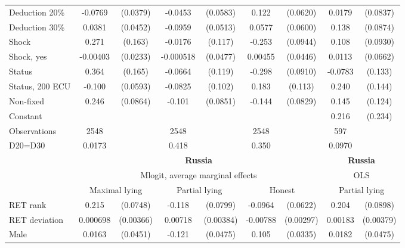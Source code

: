 \begin{tabular}{l|cccccc|cc}
Deduction 20\%&  -0.0769\sym{**} & (0.0379)&  -0.0453         & (0.0583)&    0.122\sym{**} & (0.0620)&   0.0179         & (0.0837)\\
Deduction 30\%&   0.0381         & (0.0452)&  -0.0959\sym{*}  & (0.0513)&   0.0577         & (0.0600)&    0.138         & (0.0874)\\
Shock         &    0.271\sym{*}  &  (0.163)&  -0.0176         &  (0.117)&   -0.253\sym{***}& (0.0944)&    0.108         & (0.0930)\\
Shock, yes    & -0.00403         & (0.0233)&-0.000518         & (0.0477)&  0.00455         & (0.0446)&   0.0113         & (0.0662)\\
Status        &    0.364\sym{**} &  (0.165)&  -0.0664         &  (0.119)&   -0.298\sym{***}& (0.0910)&  -0.0783         &  (0.133)\\
Status, 200 ECU&   -0.100\sym{*}  & (0.0593)&  -0.0825         &  (0.102)&    0.183         &  (0.113)&    0.240         &  (0.144)\\
Non-fixed     &    0.246\sym{***}& (0.0864)&   -0.101         & (0.0851)&   -0.144\sym{*}  & (0.0829)&    0.145         &  (0.124)\\
Constant        &                  &         &                  &         &                  &         &    0.216         &  (0.234)\\
\hline
Observations    &     2548         &         &     2548         &         &     2548         &         &      597         &         \\
D20=D30         &   0.0173         &         &    0.418         &         &    0.350         &         &   0.0970         &         \\
\hline\hline
&\multicolumn{6}{c|}{\bf Russia}&\multicolumn{2}{c}{\bf Russia}\\ &\multicolumn{6}{c|}{Mlogit, average marginal effects }&\multicolumn{2}{c}{OLS}\\
                &\multicolumn{2}{c}{Maximal lying}&\multicolumn{2}{c}{Partial lying}&\multicolumn{2}{c|}{Honest}  &\multicolumn{2}{c}{Partial lying}\\
\hline
RET rank        &    0.215\sym{***}& (0.0748)&   -0.118         & (0.0799)&  -0.0964         & (0.0622)&    0.204\sym{**} & (0.0898)\\
RET deviation   & 0.000698         &(0.00366)&  0.00718\sym{*}  &(0.00384)& -0.00788\sym{***}&(0.00297)&  0.00183         &(0.00379)\\
Male            &   0.0163         & (0.0451)&   -0.121\sym{**} & (0.0475)&    0.105\sym{***}& (0.0335)&   0.0182         & (0.0475)\\

\end{tabular}
